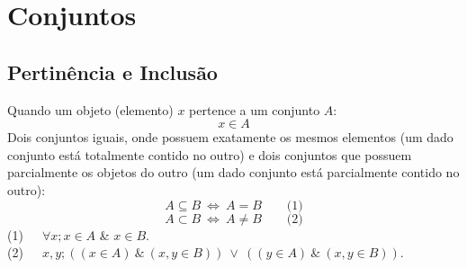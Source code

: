 \section{Conjuntos}
   \subsection{Pertinência e Inclusão}
      Quando um objeto (elemento) $x$ pertence a um conjunto $A$: $$x \in A$$
      Dois conjuntos iguais, onde possuem exatamente os mesmos elementos (um dado conjunto está totalmente contido no outro) e dois conjuntos que possuem parcialmente os objetos do outro (um dado conjunto está parcialmente contido no outro): 
      $$A \subseteq B\ \iff\ A=B\quad \quad \textrm{(1)}$$  
      $$A \subset B\ \iff\ A \neq B\quad \quad \textrm{(2)}$$
      (1)\ \ \ $\forall x; x \in A$ \& $x \in B$. \\
      (2)\ \ \ $x,y; ((x \in A)\ \&\ (x,y \in B))\ \lor\ ((y \in A)\ \&\ (x,y \in B))$.

